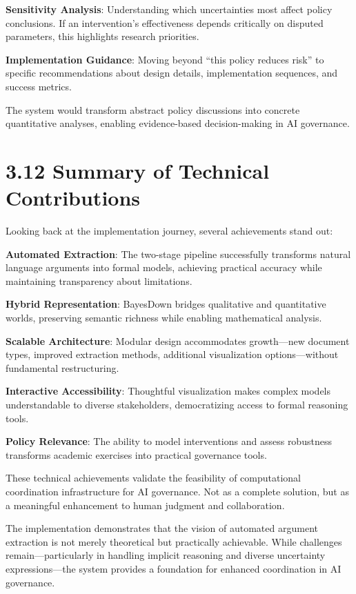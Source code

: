 \documentclass[
  11pt,
  letterpaper,
  openany]{book}
\begin{document}
\textbf{Sensitivity Analysis}: Understanding which uncertainties most
affect policy conclusions. If an intervention's effectiveness depends
critically on disputed parameters, this highlights research priorities.

\textbf{Implementation Guidance}: Moving beyond ``this policy reduces
risk'' to specific recommendations about design details, implementation
sequences, and success metrics.

The system would transform abstract policy discussions into concrete
quantitative analyses, enabling evidence-based decision-making in AI
governance.

\section{3.12 Summary of Technical
Contributions}\label{sec-technical-summary}

Looking back at the implementation journey, several achievements stand
out:

\textbf{Automated Extraction}: The two-stage pipeline successfully
transforms natural language arguments into formal models, achieving
practical accuracy while maintaining transparency about limitations.

\textbf{Hybrid Representation}: BayesDown bridges qualitative and
quantitative worlds, preserving semantic richness while enabling
mathematical analysis.

\textbf{Scalable Architecture}: Modular design accommodates growth---new
document types, improved extraction methods, additional visualization
options---without fundamental restructuring.

\textbf{Interactive Accessibility}: Thoughtful visualization makes
complex models understandable to diverse stakeholders, democratizing
access to formal reasoning tools.

\textbf{Policy Relevance}: The ability to model interventions and assess
robustness transforms academic exercises into practical governance
tools.

These technical achievements validate the feasibility of computational
coordination infrastructure for AI governance. Not as a complete
solution, but as a meaningful enhancement to human judgment and
collaboration.

The implementation demonstrates that the vision of automated argument
extraction is not merely theoretical but practically achievable. While
challenges remain---particularly in handling implicit reasoning and
diverse uncertainty expressions---the system provides a foundation for
enhanced coordination in AI governance.
\end{document}
